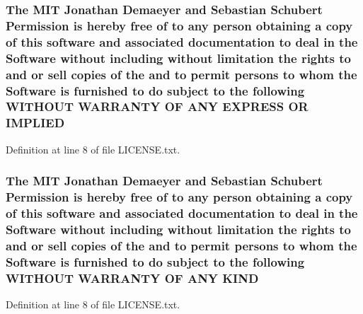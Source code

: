 \subsubsection[{\texorpdfstring{I\+M\+P\+L\+I\+ED}{IMPLIED}}]{\setlength{\rightskip}{0pt plus 5cm}The M\+IT Jonathan Demaeyer and Sebastian Schubert Permission is hereby free of to any person obtaining a {\bf copy} of this software and associated documentation to deal in the {\bf Software} without including without limitation the rights to and or sell copies of the and to permit persons to whom the {\bf Software} is furnished to do subject to the following W\+I\+T\+H\+O\+UT W\+A\+R\+R\+A\+N\+TY OF A\+NY E\+X\+P\+R\+E\+SS OR I\+M\+P\+L\+I\+ED}\hypertarget{LICENSE_8txt_a0f296e8325b962869e8026bdd8d12336}{}\label{LICENSE_8txt_a0f296e8325b962869e8026bdd8d12336}


Definition at line 8 of file L\+I\+C\+E\+N\+S\+E.\+txt.

\subsubsection[{\texorpdfstring{K\+I\+ND}{KIND}}]{\setlength{\rightskip}{0pt plus 5cm}The M\+IT Jonathan Demaeyer and Sebastian Schubert Permission is hereby free of to any person obtaining a {\bf copy} of this software and associated documentation to deal in the {\bf Software} without including without limitation the rights to and or sell copies of the and to permit persons to whom the {\bf Software} is furnished to do subject to the following W\+I\+T\+H\+O\+UT W\+A\+R\+R\+A\+N\+TY OF A\+NY K\+I\+ND}\hypertarget{LICENSE_8txt_aad2be92199d1e111cb85f40e59591e92}{}\label{LICENSE_8txt_aad2be92199d1e111cb85f40e59591e92}


Definition at line 8 of file L\+I\+C\+E\+N\+S\+E.\+txt.


